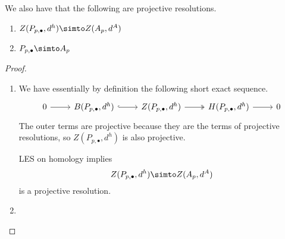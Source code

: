 \documentclass[main.tex]{subfiles}
\begin{document}
\begin{proposition}
  We also have that the following are projective resolutions.
  \begin{enumerate}
    \item $Z(P_{p,\bullet}, d^{h}) \simto Z(A_{p}, d^{A})$

    \item $P_{p,\bullet} \simto A_{p}$
  \end{enumerate}
\end{proposition}
\begin{proof}
  \leavevmode
  \begin{enumerate}
    \item We have essentially by definition the following short exact sequence.
      \begin{equation*}
        \begin{tikzcd}
          0
          \arrow[r]
          & B(P_{p, \bullet}, d^{h})
          \arrow[r, hook]
          & Z(P_{p, \bullet}, d^{h})
          \arrow[r, two heads]
          & H(P_{p, \bullet}, d^{h})
          \arrow[r]
          & 0
        \end{tikzcd}
      \end{equation*}
      The outer terms are projective because they are the terms of projective resolutions, so $Z(P_{p,\bullet}, d^{h})$ is also projective.

      LES on homology implies
      \begin{equation*}
        Z(P_{p,\bullet}, d^{h}) \simto Z(A_{p}, d^{A})
      \end{equation*}
      is a projective resolution.

    \item
  \end{enumerate}
\end{proof}
\end{document}
